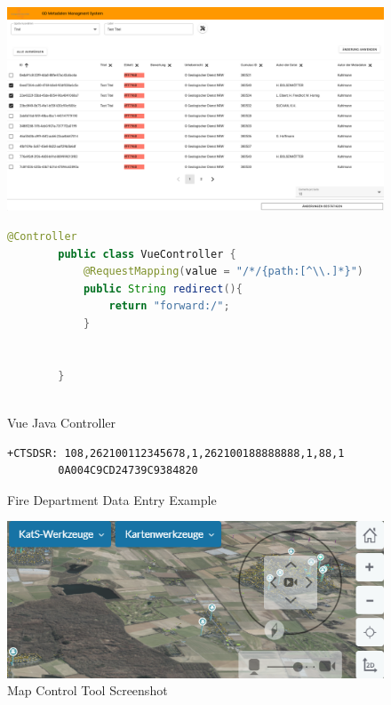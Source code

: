 \documentclass[11pt, titlepage, a4paper]{article}
\begin{document}
\begin{appendices}
\begin{figure}[H]
        \includegraphics[width=16cm]{multiedit.png}
        \centering
    \end{figure}
    \begin{figure}[H]
        \caption{Vue Java Controller}
        \label{fig:vue}
        \begin{lstlisting}[language=java, frame=single]
        @Controller
        public class VueController {
            @RequestMapping(value = "/*/{path:[^\\.]*}")
            public String redirect(){
                return "forward:/";
            }
        
        
        }
        
        \end{lstlisting}
        \centering
    \end{figure}
    \begin{figure}[t]
        \caption{Fire Department Data Entry Example}
        \label{fig:pei}
        \begin{lstlisting}[frame=single]
        +CTSDSR: 108,262100112345678,1,262100188888888,1,88,1
        0A004C9CD24739C9384820
    \end{lstlisting}
        \centering
    \end{figure}

    \begin{figure}[H]
        \caption{Map Control Tool Screenshot}
        \label{fig:mapcontrol}
        \includegraphics[width=16cm]{dzgefahr_mapcontrol.png}
        \centering
    \end{figure}
\end{appendices}
\end{document}
